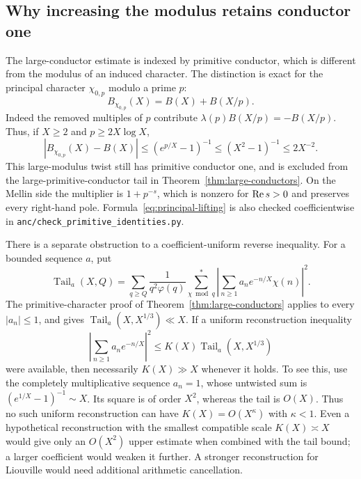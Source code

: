 \subsection{Why increasing the modulus retains conductor one}
\label{ssec:principal-conductor}

The large-conductor estimate is indexed by primitive conductor, which
is different from the modulus of an induced character. The distinction
is exact for the principal character $\chi_{0,p}$ modulo a prime $p$:
\begin{equation}\label{eq:principal-lifting}
 B_{\chi_{0,p}}(X)=B(X)+B(X/p).
\end{equation}
Indeed the removed multiples of $p$ contribute
$\lambda(p)B(X/p)=-B(X/p)$. Thus, if $X\ge2$ and
$p\ge2X\log X$,
\[
 |B_{\chi_{0,p}}(X)-B(X)|
 \le(e^{p/X}-1)^{-1}\le(X^2-1)^{-1}\le2X^{-2}.
\]
This large-modulus twist still has primitive conductor one, and is
excluded from the large-primitive-conductor tail in
Theorem~\ref{thm:large-conductors}. On the Mellin side the multiplier
is $1+p^{-s}$, which is nonzero for $\operatorname{Re} s>0$ and preserves every
right-hand pole. Formula~\eqref{eq:principal-lifting} is also checked
coefficientwise in \texttt{anc/check\_primitive\_identities.py}.

There is a separate obstruction to a coefficient-uniform reverse
inequality. For a bounded sequence $a$, put
\[
 \operatorname{Tail}_a(X,Q)=
 \sum_{q\ge Q}\frac1{q^2\varphi(q)}
   \sum_{\chi\bmod q}^{*}
       \left|\sum_{n\ge1}a_ne^{-n/X}\chi(n)\right|^2.
\]
The primitive-character proof of Theorem~\ref{thm:large-conductors}
applies to every $|a_n|\le1$, and gives
$\operatorname{Tail}_a(X,X^{1/3})\ll X$.
If a uniform reconstruction inequality
\[
 \left|\sum_{n\ge1}a_ne^{-n/X}\right|^2
       \le K(X)\operatorname{Tail}_a(X,X^{1/3})
\]
were available, then necessarily $K(X)\gg X$ whenever it holds.
To see this, use the completely multiplicative sequence $a_n=1$,
whose untwisted sum is $(e^{1/X}-1)^{-1}\sim X$. Its square is of
order $X^2$, whereas the tail is $O(X)$. Thus no such uniform
reconstruction can have $K(X)=O(X^\kappa)$ with $\kappa<1$.
Even a hypothetical reconstruction with the smallest compatible
scale $K(X)\asymp X$ would give only an $O(X^2)$ upper estimate
when combined with the tail bound; a larger coefficient would
weaken it further. A stronger reconstruction for Liouville would
need additional arithmetic cancellation.
